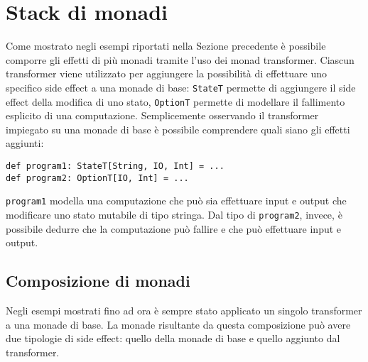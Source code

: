 \section{Stack di monadi}
\label{sec:stack-di-monadi}

Come mostrato negli esempi riportati nella Sezione precedente è possibile comporre gli effetti di più monadi tramite l'uso dei monad transformer. Ciascun transformer viene utilizzato per aggiungere la possibilità di effettuare uno specifico side effect a una monade di base: \lstinline{StateT} permette di aggiungere il side effect della modifica di uno stato, \lstinline{OptionT} permette di modellare il fallimento esplicito di una computazione.
Semplicemente osservando il transformer impiegato su una monade di base è possibile comprendere quali siano gli effetti aggiunti:
\begin{lstlisting}[language=scala3]
def program1: StateT[String, IO, Int] = ...
def program2: OptionT[IO, Int] = ...
\end{lstlisting}
\lstinline{program1} modella una computazione che può sia effettuare input e output che modificare uno stato mutabile di tipo stringa. Dal tipo di \lstinline{program2}, invece, è possibile dedurre che la computazione può fallire e che può effettuare input e output.

\subsection{Composizione di monadi}
Negli esempi mostrati fino ad ora è sempre stato applicato un singolo transformer a una monade di base. La monade risultante da questa composizione può avere due tipologie di side effect: quello della monade di base e quello aggiunto dal transformer.

